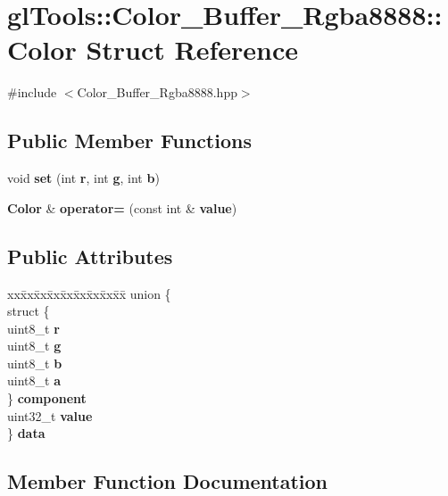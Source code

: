 \section{gl\+Tools\+::Color\+\_\+\+Buffer\+\_\+\+Rgba8888\+::Color Struct Reference}
\label{structgl_tools_1_1_color___buffer___rgba8888_1_1_color}


{\ttfamily \#include $<$Color\+\_\+\+Buffer\+\_\+\+Rgba8888.\+hpp$>$}

\subsection*{Public Member Functions}
\begin{DoxyCompactItemize}
\item 
void \textbf{ set} (int \textbf{ r}, int \textbf{ g}, int \textbf{ b})
\item 
\textbf{ Color} \& \textbf{ operator=} (const int \&\textbf{ value})
\end{DoxyCompactItemize}
\subsection*{Public Attributes}
\begin{DoxyCompactItemize}
\item 
\begin{tabbing}
xx\=xx\=xx\=xx\=xx\=xx\=xx\=xx\=xx\=\kill
union \{\\
\>struct \{\\
\>\>uint8\_t \textbf{ r}\\
\>\>uint8\_t \textbf{ g}\\
\>\>uint8\_t \textbf{ b}\\
\>\>uint8\_t \textbf{ a}\\
\>\} \textbf{ component}\\
\>uint32\_t \textbf{ value}\\
\} \textbf{ data}\\

\end{tabbing}\end{DoxyCompactItemize}


\subsection{Member Function Documentation}
\mbox{\label{structgl_tools_1_1_color___buffer___rgba8888_1_1_color_a300d857dc1a336972c783d2bf1097ae2}} 
